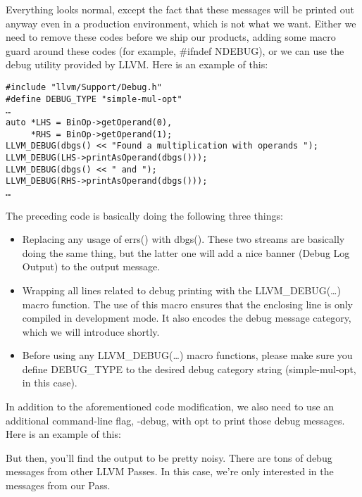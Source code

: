 Everything looks normal, except the fact that these messages will be printed out anyway even in a production environment, which is not what we want. Either we need to remove these codes before we ship our products, adding some macro guard around these codes (for example, \#ifndef NDEBUG), or we can use the debug utility provided by LLVM. Here is an example of this:

\begin{lstlisting}[style=styleCXX]
#include "llvm/Support/Debug.h"
#define DEBUG_TYPE "simple-mul-opt"
…
auto *LHS = BinOp->getOperand(0),
     *RHS = BinOp->getOperand(1);
LLVM_DEBUG(dbgs() << "Found a multiplication with operands ");
LLVM_DEBUG(LHS->printAsOperand(dbgs()));
LLVM_DEBUG(dbgs() << " and ");
LLVM_DEBUG(RHS->printAsOperand(dbgs()));
…
\end{lstlisting}

The preceding code is basically doing the following three things:

\begin{itemize}
\item Replacing any usage of errs() with dbgs(). These two streams are basically doing the same thing, but the latter one will add a nice banner (Debug Log Output) to the output message.

\item Wrapping all lines related to debug printing with the LLVM\_DEBUG(…) macro function. The use of this macro ensures that the enclosing line is only compiled in development mode. It also encodes the debug message category, which we will introduce shortly.

\item Before using any LLVM\_DEBUG(…) macro functions, please make sure you define DEBUG\_TYPE to the desired debug category string (simple-mul-opt, in this case).

\end{itemize}

In addition to the aforementioned code modification, we also need to use an additional command-line flag, -debug, with opt to print those debug messages. Here is an example of this:


But then, you'll find the output to be pretty noisy. There are tons of debug messages from other LLVM Passes. In this case, we're only interested in the messages from our Pass.

